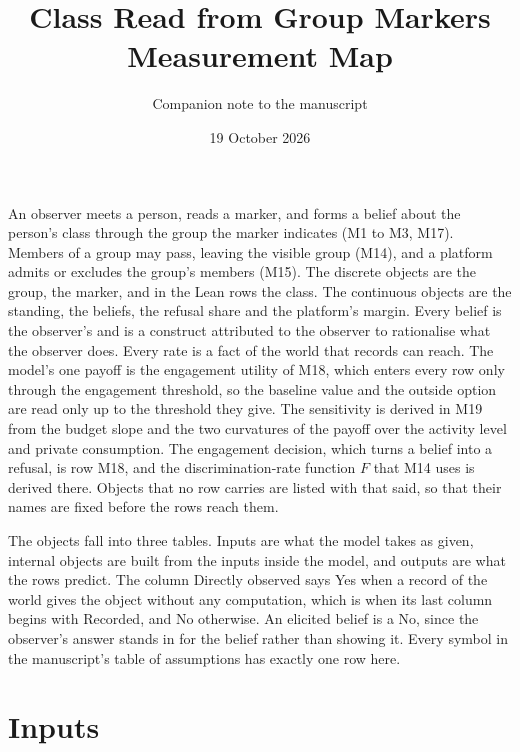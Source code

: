 \documentclass[11pt]{article}
\title{Class Read from Group Markers\\ Measurement Map}
\author{Companion note to the manuscript}
\date{19 October 2026}
\begin{document}
\maketitle

\noindent An observer meets a person, reads a marker, and forms a belief
about the person's class through the group the marker indicates (M1 to M3,
M17). Members of a group may pass, leaving the visible group (M14), and a
platform admits or excludes the group's members (M15). The discrete objects
are the group, the marker, and in the Lean rows the class. The continuous
objects are the standing, the beliefs, the refusal share and the platform's
margin. Every belief is the observer's and is a construct attributed to the
observer to rationalise what the observer does. Every rate is a fact of the
world that records can reach. The model's one payoff
is the engagement utility of M18, which enters every row only through the
engagement threshold, so the baseline value and the outside
option are read only up to the threshold they give. The sensitivity is
derived in M19 from the budget slope and the two curvatures of the payoff
over the activity level and private consumption. The engagement decision,
which turns a belief into a refusal, is row
M18, and the discrimination-rate function $F$ that M14 uses is derived
there. Objects that no row carries are listed with that said, so that their
names are fixed before the rows reach them.

The objects fall into three tables. Inputs are what the model takes as given,
internal objects are built from the inputs inside the model, and outputs are
what the rows predict. The column Directly observed says Yes when a record of
the world gives the object without any computation, which is when its last
column begins with Recorded, and No otherwise. An elicited belief is a No,
since the observer's answer stands in for the belief rather than showing it.
Every symbol in the manuscript's table of assumptions has exactly one row
here.

\section*{Inputs}
\end{document}
